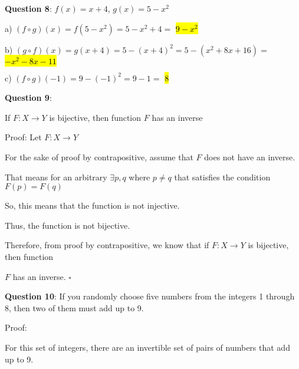 \documentclass{article} %
\newcommand{\question}[2][]{\begin{flushleft}
        \textbf{Question #1}: #2

\end{flushleft}}
\begin{document}
    \question[8]{$f(x) = x + 4$, $g(x) = 5-x^2$}

    a) $(f \circ g)(x) = f(5 - x^2) = 5 - x^2 + 4 =$ \hl{$9 - x^2$}

    b) $(g \circ f)(x) = g(x + 4) = 5 - (x + 4)^2 = 5 - (x^2 + 8x + 16) =$ \hl{$-x^2 - 8x - 11$}

    c) $(f \circ g)(-1) = 9 - (-1)^2 = 9 - 1 =$ \hl{8}


    \question[9]{}

    If $F: X \rightarrow Y$ is bijective, then function $F$ has an inverse

    Proof: Let $F: X \rightarrow Y$

    For the sake of proof by contrapositive, assume that $F$ does not have an inverse.

    That means for an arbitrary $\exists p, q$ where $p \neq q$ that satisfies the condition $F(p) = F(q)$

    So, this means that the function is not injective.

    Thus, the function is not bijective.

    Therefore, from proof by contrapositive, we know that if $F: X \rightarrow Y$ is bijective, then function
    
    $F$ has an inverse. $\square$

                                                                       

    \question[10]{If you randomly choose five numbers from the integers 1 through 8, then two of them must add up to 9.}

    Proof:

    For this set of integers, there are an invertible set of pairs of numbers that add up to 9.
\end{document}
